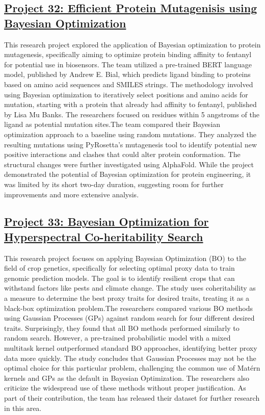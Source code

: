  \subsection*{\href{https://www.youtube.com/watch?v=fxpDX7Wmdc0}{Project 32: Efficient Protein Mutagenisis using Bayesian Optimization}}

This research project explored the application of Bayesian optimization to protein mutagenesis, specifically aiming to optimize protein binding affinity to fentanyl for potential use in biosensors. The team utilized a pre-trained BERT language model, published by Andrew E. Bial, which predicts ligand binding to proteins based on amino acid sequences and SMILES strings. The methodology involved using Bayesian optimization to iteratively select positions and amino acids for mutation, starting with a protein that already had affinity to fentanyl, published by Lisa Mu Banks. The researchers focused on residues within 5 angstroms of the ligand as potential mutation sites.The team compared their Bayesian optimization approach to a baseline using random mutations. They analyzed the resulting mutations using PyRosetta's mutagenesis tool to identify potential new positive interactions and clashes that could alter protein conformation. The structural changes were further investigated using AlphaFold. While the project demonstrated the potential of Bayesian optimization for protein engineering, it was limited by its short two-day duration, suggesting room for further improvements and more extensive analysis.
 \subsection*{\href{https://www.youtube.com/watch?v=mY6Empkb8L4}{Project 33: Bayesian Optimization for Hyperspectral Co-heritability Search}}

This research project focuses on applying Bayesian Optimization (BO) to the field of crop genetics, specifically for selecting optimal proxy data to train genomic prediction models. The goal is to identify resilient crops that can withstand factors like pests and climate change. The study uses coheritability as a measure to determine the best proxy traits for desired traits, treating it as a black-box optimization problem.The researchers compared various BO methods using Gaussian Processes (GPs) against random search for four different desired traits. Surprisingly, they found that all BO methods performed similarly to random search. However, a pre-trained probabilistic model with a mixed multitask kernel outperformed standard BO approaches, identifying better proxy data more quickly. The study concludes that Gaussian Processes may not be the optimal choice for this particular problem, challenging the common use of Matérn kernels and GPs as the default in Bayesian Optimization. The researchers also criticize the widespread use of these methods without proper justification. As part of their contribution, the team has released their dataset for further research in this area.
